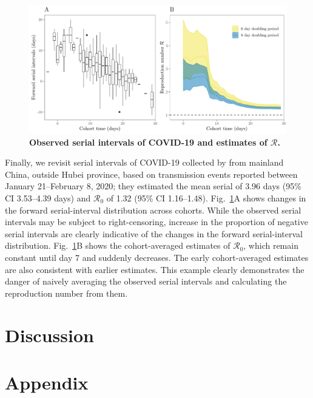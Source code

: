 \documentclass[12pt]{article}
\newcommand{\fref}[1]{Fig.~\ref{fig:#1}}
\begin{document}
\begin{figure}
\includegraphics[width=\textwidth]{serial_analysis.pdf}
\caption{
\textbf{Observed serial intervals of COVID-19 and estimates of $\mathcal R$.}
}
\label{fig:du}
\end{figure}

Finally, we revisit serial intervals of COVID-19 collected by \cite{du2020serial} from mainland China, outside Hubei province, based on transmission events reported between January 21--February 8, 2020;
they estimated the mean serial of 3.96 days (95\% CI 3.53–4.39 days) and $\mathcal R_0$ of 1.32 (95\% CI 1.16–1.48).
\fref{du}A shows changes in the forward serial-interval distribution across cohorts.
While the observed serial intervals may be subject to right-censoring, increase in the proportion of negative serial intervals are clearly indicative of the changes in the forward serial-interval distribution.
\fref{du}B shows the cohort-averaged estimates of $\mathcal R_0$, which remain constant until day 7 and suddenly decreases.
The early cohort-averaged estimates are also consistent with earlier estimates.
This example clearly demonstrates the danger of naively averaging the observed serial intervals and calculating the reproduction number from them.

\section{Discussion}

\section*{Appendix}
\end{document}
